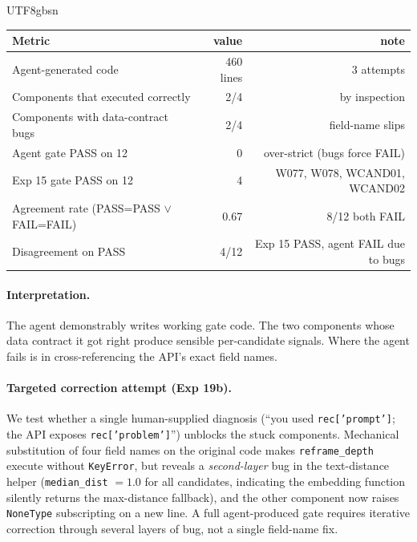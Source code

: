 \documentclass{article}
\begin{document}
\begin{CJK*}{UTF8}{gbsn}
\begin{center}\small
\begin{tabular}{l r r}
  \toprule
  Metric & value & note \\
  \midrule
  Agent-generated code & 460 lines & 3 attempts \\
  Components that executed correctly & 2/4 & by inspection \\
  Components with data-contract bugs & 2/4 & field-name slips \\
  Agent gate PASS on 12 & 0 & over-strict (bugs force FAIL) \\
  Exp 15 gate PASS on 12 & 4 & W077, W078, WCAND01, WCAND02 \\
  Agreement rate (PASS=PASS $\vee$ FAIL=FAIL) & 0.67 & 8/12 both FAIL \\
  Disagreement on PASS & 4/12 & Exp 15 PASS, agent FAIL due to bugs \\
  \bottomrule
\end{tabular}
\end{center}

\paragraph{Interpretation.} The agent demonstrably writes working
gate code. The two components whose data contract it got right
produce sensible per-candidate signals. Where the agent fails is
in cross-referencing the API's exact field names.

\paragraph{Targeted correction attempt (Exp 19b).} We test
whether a single human-supplied diagnosis (``you used
\texttt{rec['prompt']}; the API exposes \texttt{rec['problem']}'')
unblocks the stuck components. Mechanical substitution of four
field names on the original code makes \texttt{reframe\_depth}
execute without \texttt{KeyError}, but reveals a
\emph{second-layer} bug in the text-distance helper
(\texttt{median\_dist} \(=1.0\) for all candidates, indicating
the embedding function silently returns the max-distance
fallback), and the other component now raises \texttt{NoneType}
subscripting on a new line. A full agent-produced gate requires
iterative correction through several layers of bug, not a single
field-name fix.


\end{CJK*}
\end{document}

